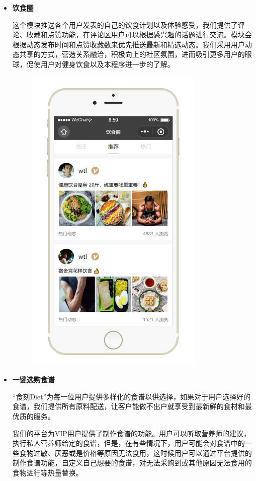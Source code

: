 \documentclass[UTF8,12pt]{ctexart}
\numberwithin{figure}{section}%
\begin{document}
\begin{spacing}{2}
\begin{itemize}
	\item\textbf{饮食圈}
	
	这个模块推送各个用户发表的自己的饮食计划以及体验感受，我们提供了评论、收藏和点赞功能，在评论区用户可以根据感兴趣的话题进行交流。模块会根据动态发布时间和点赞收藏数来优先推送最新和精选动态。我们采用用户动态共享的方式，营造关系融洽，积极向上的社区氛围，进而吸引更多用户的眼球，促使用户对健身饮食以及本程序进一步的了解。
	
	\begin{figure}[!htb]
		\centering
		\includegraphics[width=8.5cm]{fig/!4}
	\end{figure}
	
	\newpage
	
	\item\textbf{一键选购食谱}
	
	“食刻Diet”为每一位用户提供多样化的食谱以供选择，如果对于用户选择好的食谱，我们提供所有原料配送，让客户能做不出户就享受到最新鲜的食材和最优质的服务。
	
	我们的平台为VIP用户提供了制作食谱的功能。用户可以听取营养师的建议，执行私人营养师给定的食谱，但是，在有些情况下，用户可能会对食谱中的一些食物过敏、厌恶或是价格等原因无法食用，这时候用户可以通过平台提供的制作食谱功能，自定义自己想要的食谱，对无法采购到或其他原因无法食用的食物进行等热量替换。
	

\end{itemize}
\end{spacing}
\end{document}
